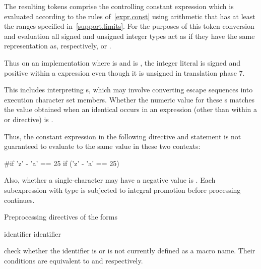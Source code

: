 \documentclass{wg21}
\newcommand{\clb}[1]{\removed{#1} \added{\grammarterm{line-break}}}
\begin{document}
\pnum
The resulting tokens comprise the controlling constant expression
which is evaluated according to the rules of~\ref{expr.const}
using arithmetic that has at least the ranges specified
in~\ref{support.limits}. For the purposes of this token conversion and evaluation
all signed and unsigned integer types
act as if they have the same representation as, respectively,
 or .
\begin{note}
    Thus on an
    implementation where  is 
    and  is ,
    the integer literal  is signed and positive within a 
    expression even though it is unsigned in translation phase
    7.
\end{note}
This includes interpreting s, which may involve
converting escape sequences into execution character set members.
Whether the numeric value for these s
matches the value obtained when an identical 
occurs in an expression
(other than within a
or
directive)
is .
\begin{note}
    Thus, the constant expression in the following
    directive and
     statement
    is not guaranteed to evaluate to the same value in these two
    contexts:
    \begin{codeblock}
        #if 'z' - 'a' == 25
        if ('z' - 'a' == 25)
    \end{codeblock}
\end{note}
Also, whether a single-character  may have a negative
value is .
Each subexpression with type
is subjected to integral promotion before processing continues.

\pnum
Preprocessing directives of the forms
\begin{ncsimplebnf}\obeyspaces
     identifier \clb{new-line} \br
     identifier \clb{new-line} 
\end{ncsimplebnf}
check whether the identifier is or is not currently defined as a macro name.
Their conditions are equivalent to
and
respectively.
\end{document}
